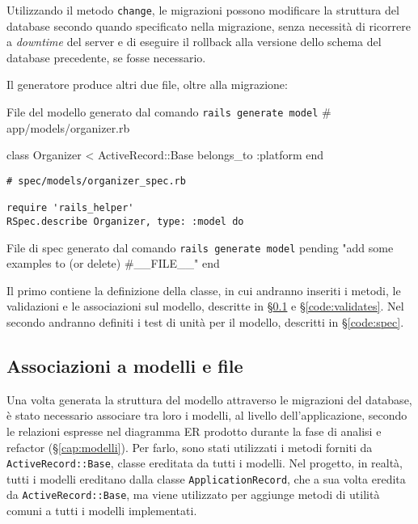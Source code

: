 \noindent Utilizzando il metodo \verb|change|, le migrazioni possono modificare la struttura del database secondo quando specificato nella migrazione, senza necessità di ricorrere a \emph{downtime} del server e di eseguire il rollback alla versione dello schema del database precedente, se fosse necessario.

Il generatore produce altri due file, oltre alla migrazione:

\begin{code}{File del modello generato dal comando \texttt{rails generate model}}
# app/models/organizer.rb

class Organizer < ActiveRecord::Base
  belongs_to :platform
end
\end{code}

\begin{verbatim}
# spec/models/organizer_spec.rb

require 'rails_helper'
RSpec.describe Organizer, type: :model do
\end{verbatim}


\begin{code}{File di spec generato dal comando \texttt{rails generate model}}
  pending "add some examples to (or delete) #{__FILE__}"
end
\end{code}

\noindent Il primo contiene la definizione della classe, in cui andranno inseriti i metodi, le validazioni e le associazioni sul modello, descritte in \S \ref{code:association} e \S \ref{code:validates}. Nel secondo andranno definiti i test di unità per il modello, descritti in \S \ref{code:spec}.

\subsection{Associazioni a modelli e file} \label{code:association}
Una volta generata la struttura del modello attraverso le migrazioni del database, è stato necessario associare tra loro i modelli, al livello dell'applicazione, secondo le relazioni espresse nel diagramma ER prodotto durante la fase di analisi e refactor (\S \ref{cap:modelli}). Per farlo, sono stati utilizzati i metodi forniti da \verb|ActiveRecord::Base|, classe ereditata da tutti i modelli. Nel progetto, in realtà, tutti i modelli ereditano dalla classe \verb|ApplicationRecord|, che a sua volta eredita da \verb|ActiveRecord::Base|, ma viene utilizzato per aggiunge metodi di utilità comuni a tutti i modelli implementati.

